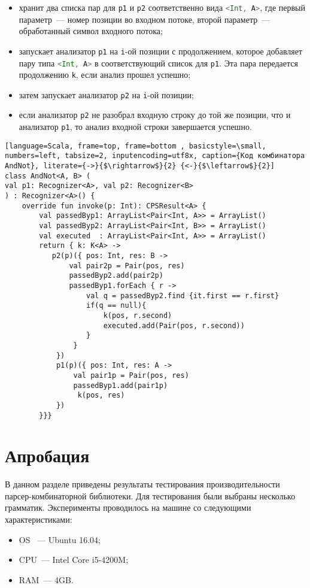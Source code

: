 \begin{itemize}
    \item хранит два списка пар  для \lstinline[language=Scala]{p1} и \lstinline[language=Scala]{p2} соответственно вида \lstinline[language=Scala]{<Int, A>}, где первый параметр~--- номер позиции во входном потоке, второй параметр~--- обработанный символ входного потока;
    \item запускает анализатор \lstinline[language=Scala]{p1} на \lstinline[language=Scala]{i}-ой позиции с продолжением, которое добавляет пару типа \lstinline[language=Scala]{<Int, A>} в соответствующий список для \lstinline[language=Scala]{p1}. Эта пара передается продолжению \lstinline[language=Scala]{k}, если анализ прошел успешно;
    \item затем запускает анализатор \lstinline[language=Scala]{p2} на \lstinline[language=Scala]{i}-ой позиции;
    \item если анализатор \lstinline[language=Scala]{p2} не разобрал входную строку до той же позиции, что и анализатор \lstinline[language=Scala]{p1}, то анализ входной строки завершается успешно.
\end{itemize}

\begin{lstlisting}[language=Scala, frame=top, frame=bottom , basicstyle=\small, numbers=left, tabsize=2, inputencoding=utf8x, caption={Код комбинатора AndNot}, literate={->}{$\rightarrow$}{2} {<-}{$\leftarrow$}{2}]
class AndNot<A, B> (
val p1: Recognizer<A>, val p2: Recognizer<B>
) : Recognizer<A>() {
    override fun invoke(p: Int): CPSResult<A> {
        val passedByp1: ArrayList<Pair<Int, A>> = ArrayList()
        val passedByp2: ArrayList<Pair<Int, B>> = ArrayList()
        val executed  : ArrayList<Pair<Int, A>> = ArrayList()
        return { k: K<A> ->
           p2(p)({ pos: Int, res: B ->
               val pair2p = Pair(pos, res)
               passedByp2.add(pair2p)
               passedByp1.forEach { r ->
                   val q = passedByp2.find {it.first == r.first}
                   if(q == null){
                       k(pos, r.second)
                       executed.add(Pair(pos, r.second))
                   }
                }
            })
            p1(p)({ pos: Int, res: A ->
                val pair1p = Pair(pos, res)
                passedByp1.add(pair1p)
                 k(pos, res)
            })
        }}}
\end{lstlisting}

\section{Апробация}
В данном разделе приведены результаты тестирования производительности парсер-комбинаторной библиотеки. Для тестирования были выбраны несколько грамматик. Эксперименты проводилось на машине со следующими характеристиками:
\begin{itemize}
     \item  OS ~--- Ubuntu 16.04;
     \item  CPU~--- Intel Core i5-4200M;
     \item  RAM~--- 4GB.
\end{itemize}

